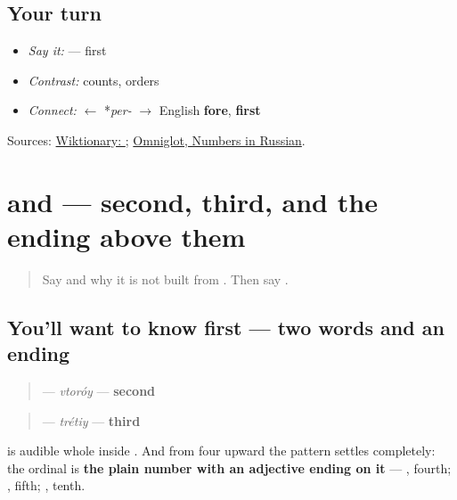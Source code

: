 \subsection*{Your turn}
\begin{itemize}
\raggedright
  \item \emph{Say it:} \textbf{} — first
  \item \emph{Contrast:} \textbf{} counts, \textbf{} orders
  \item \emph{Connect:} \textbf{} $\leftarrow$ *\emph{per-} $\to$ English \textbf{fore}, \textbf{first}
\end{itemize}

\begin{tcolorbox}[breakable,colback=teal!4,colframe=teal!35!black,title={Before you move on}]
Sources: \href{https://en.wiktionary.org/wiki/\%D0\%BF\%D0\%B5\%D1\%80\%D0\%B2\%D1\%8B\%D0\%B9}{Wiktionary: }; \href{https://www.omniglot.com/language/numbers/russian.htm}{Omniglot, Numbers in Russian}.
\end{tcolorbox}
\section[\texorpdfstring{\ru{второй} \ru{третий} (vtoróy trétiy)}{второй третий (vtoróy trétiy)}]{ and  — second, third, and the ending above them}

\label{lesson:RU-C26-vtoroy-tretiy}



\begin{quote}
Say \textbf{} and why it is not built from \textbf{}. Then say \textbf{}.
\end{quote}

\subsection*{You'll want to know first — two words and an ending}
\begin{quote}
\textbf{} — \emph{vtoróy} — \textbf{second}
\end{quote}

\begin{quote}
\textbf{} — \emph{trétiy} — \textbf{third}
\end{quote}

\textbf{} is audible whole inside \textbf{}. And from four upward the pattern settles completely: the ordinal is \textbf{the plain number with an adjective ending on it} — \textbf{}, fourth; \textbf{}, fifth; \textbf{}, tenth.

